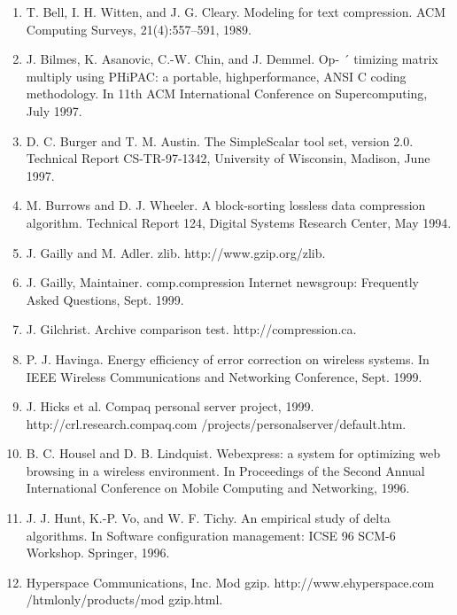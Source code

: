 \documentclass{article}
\begin{document}
\begin{enumerate}
	\item T. Bell, I. H. Witten, and J. G. Cleary. Modeling for text
	compression. ACM Computing Surveys, 21(4):557–591,
	1989.

	\item J. Bilmes, K. Asanovic, C.-W. Chin, and J. Demmel. Op- ´
	timizing matrix multiply using PHiPAC: a portable, highperformance, ANSI C coding methodology. In 11th ACM
	International Conference on Supercomputing, July 1997.
	
	\item D. C. Burger and T. M. Austin. The SimpleScalar tool
	set, version 2.0. Technical Report CS-TR-97-1342, University of Wisconsin, Madison, June 1997.
	
	\item M. Burrows and D. J. Wheeler. A block-sorting lossless
	data compression algorithm. Technical Report 124, Digital Systems Research Center, May 1994.
	
	\item J. Gailly and M. Adler. zlib. http://www.gzip.org/zlib.
	
	\item J. Gailly, Maintainer. comp.compression Internet
	newsgroup: Frequently Asked Questions, Sept. 1999.

	\item J. Gilchrist. Archive comparison test.
	http://compression.ca.
	
	\item P. J. Havinga. Energy efficiency of error correction on
	wireless systems. In IEEE Wireless Communications and
	Networking Conference, Sept. 1999.
	
	\item J. Hicks et al. Compaq personal server
	project, 1999. http://crl.research.compaq.com
	/projects/personalserver/default.htm.

	\item B. C. Housel and D. B. Lindquist. Webexpress: a system
	for optimizing web browsing in a wireless environment.
	In Proceedings of the Second Annual International Conference on Mobile Computing and Networking, 1996.

	\item J. J. Hunt, K.-P. Vo, and W. F. Tichy. An empirical study
	of delta algorithms. In Software configuration management: ICSE 96 SCM-6 Workshop. Springer, 1996.

	\item Hyperspace Communications, Inc.
	Mod gzip. http://www.ehyperspace.com /htmlonly/products/mod gzip.html.


\end{enumerate}
\end{document}
